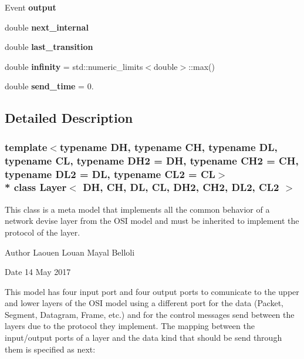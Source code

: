 \begin{DoxyCompactItemize}
\item 
Event {\bfseries output}\hypertarget{classLayer_a3701dfd2133046db9c6e5ee4280a0b59}{}\label{classLayer_a3701dfd2133046db9c6e5ee4280a0b59}

\item 
double {\bfseries next\+\_\+internal}\hypertarget{classLayer_a34f12ad31909eb23876f11bd414c5a87}{}\label{classLayer_a34f12ad31909eb23876f11bd414c5a87}

\item 
double {\bfseries last\+\_\+transition}\hypertarget{classLayer_a4159d408eff834a4e80439a0d05fcddd}{}\label{classLayer_a4159d408eff834a4e80439a0d05fcddd}

\item 
double {\bfseries infinity} = std\+::numeric\+\_\+limits$<$double$>$\+::max()\hypertarget{classLayer_a450c3707171bd64904e6a1fcd5c8de1a}{}\label{classLayer_a450c3707171bd64904e6a1fcd5c8de1a}

\item 
double {\bfseries send\+\_\+time} = 0.\hypertarget{classLayer_adf1d2eddfe40d3b94bd98a10f6226999}{}\label{classLayer_adf1d2eddfe40d3b94bd98a10f6226999}

\end{DoxyCompactItemize}


\subsection{Detailed Description}
\subsubsection*{template$<$typename DH, typename CH, typename DL, typename CL, typename D\+H2 = DH, typename C\+H2 = CH, typename D\+L2 = DL, typename C\+L2 = CL$>$\\*
class Layer$<$ D\+H, C\+H, D\+L, C\+L, D\+H2, C\+H2, D\+L2, C\+L2 $>$}

This class is a meta model that implements all the common behavior of a network devise layer from the O\+SI model and must be inherited to implement the protocol of the layer. 

\begin{DoxyAuthor}{Author}
Laouen Louan Mayal Belloli 
\end{DoxyAuthor}
\begin{DoxyDate}{Date}
14 May 2017
\end{DoxyDate}
This model has four input port and four output ports to comunicate to the upper and lower layers of the O\+SI model using a different port for the data (Packet, Segment, Datagram, Frame, etc.) and for the control messages send between the layers due to the protocol they implement. The mapping between the input/output ports of a layer and the data kind that should be send through them is specified as next\+:

